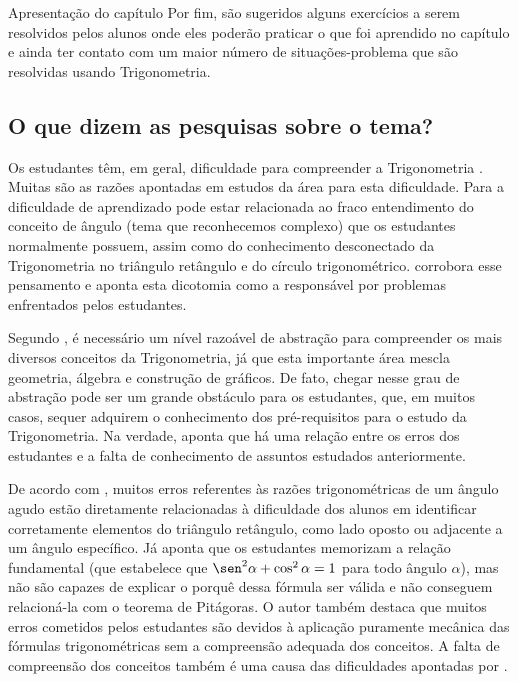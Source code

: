 \begin{apresentacao}{Apresentação do capítulo}
Por fim, são sugeridos alguns exercícios a serem resolvidos pelos alunos onde eles poderão praticar o que foi aprendido no capítulo e ainda ter contato com um maior número de situações-problema que são resolvidas usando Trigonometria.


\subsection*{O que dizem as pesquisas sobre o tema?}

Os estudantes têm, em geral, dificuldade para compreender a Trigonometria \citep{weber2005, brown2005}. 
%
Muitas são as razões apontadas em estudos da área para esta dificuldade.
%
Para \citet{moore2009} a dificuldade de aprendizado pode estar relacionada ao fraco entendimento do conceito de ângulo (tema que reconhecemos complexo) que os estudantes normalmente possuem, assim como do conhecimento desconectado da Trigonometria no triângulo retângulo e do círculo trigonométrico.
%
\citet{bressoud2010} corrobora esse pensamento e aponta esta dicotomia como a responsável por problemas enfrentados pelos estudantes.

Segundo \citet{weber2005}, é necessário um nível razoável de abstração para compreender os mais diversos conceitos da Trigonometria, já que esta importante área mescla geometria, álgebra e construção de gráficos. 
%
De fato, chegar nesse grau de abstração pode ser um grande obstáculo para os estudantes, que, em muitos casos, sequer adquirem o conhecimento dos pré-requisitos para o estudo da Trigonometria. 
%
Na verdade, \citet{fortes2012} aponta que há uma relação entre os erros dos estudantes e a falta de conhecimento de assuntos estudados anteriormente. 

De acordo com \citet{silvaneto2006}, muitos erros referentes às razões trigonométricas de um ângulo agudo estão diretamente relacionadas à dificuldade dos alunos em identificar corretamente elementos do triângulo retângulo, como lado oposto ou adjacente a um ângulo específico. 
%
Já \citet{gur2009} aponta que os estudantes memorizam a relação fundamental (que estabelece que $\sen^2\alpha+\cos^2\alpha=1$ para todo ângulo $\alpha$), mas não são capazes de explicar o porquê dessa fórmula ser válida e não conseguem relacioná-la com o teorema de Pitágoras. 
%
O autor também destaca que muitos erros cometidos pelos estudantes são devidos à aplicação puramente mecânica das fórmulas trigonométricas sem a compreensão adequada dos conceitos. 
%
A falta de compreensão dos conceitos também é uma causa das dificuldades apontadas por \citet{dioniziobrandt2011}.


\end{apresentacao}
